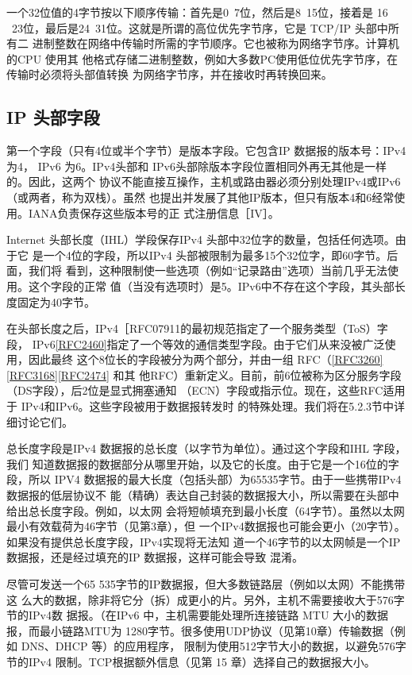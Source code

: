 一个32位值的4字节按以下顺序传输：首先是0~7位，然后是8~15位，接着是
16 ~23位，最后是24~31位。这就是所谓的高位优先字节序，它是 TCP/IP 头部中所有二
进制整数在网络中传输时所需的字节顺序。它也被称为网络字节序。计算机的CPU 使用其
他格式存储二进制整数，例如大多数PC使用低位优先字节序，在传输时必须将头部值转换
为网络字节序，并在接收时再转换回来。

\subsection{IP 头部字段}
第一个字段（只有4位或半个字节）是版本字段。它包含IP 数据报的版本号：IPv4 为4，
IPv6 为6。IPv4头部和 IPv6头部除版本字段位置相同外再无其他是一样的。因此，这两个
协议不能直接互操作，主机或路由器必须分别处理IPv4或IPv6（或两者，称为双栈）。虽然
也提出并发展了其他IP版本，但只有版本4和6经常使用。IANA负责保存这些版本号的正
式注册信息［IV］。

Internet 头部长度（IHL）学段保存IPv4 头部中32位字的数量，包括任何选项。由于它
是一个4位的字段，所以IPv4 头部被限制为最多15个32位字，即60字节。后面，我们将
看到，这种限制使一些选项（例如“记录路由”选项）当前几乎无法使用。这个字段的正常
值（当没有选项时）是5。IPv6中不存在这个字段，其头部长度固定为40字节。

在头部长度之后，IPv4［RFC07911的最初规范指定了一个服务类型（ToS）字段，
IPv6\href{https://www.rfc-editor.org/rfc/rfc2460}{[RFC2460]}指定了一个等效的通信类型字段。由于它们从来没被广泛使用，因此最终
这个8位长的字段被分为两个部分，并由一组 RFC（\href{https://www.rfc-editor.org/rfc/rfc3260}{[RFC3260]}\href{https://www.rfc-editor.org/rfc/rfc3168}{[RFC3168]}\href{https://www.rfc-editor.org/rfc/rfc2474}{[RFC2474]} 和其
他RFC）重新定义。目前，前6位被称为区分服务字段（DS字段），后2位是显式拥塞通知
（ECN）字段或指示位。现在，这些RFC适用于 IPv4和IPv6。这些字段被用于数据报转发时
的特殊处理。我们将在5.2.3节中详细讨论它们。

总长度字段是IPv4 数据报的总长度（以字节为单位）。通过这个字段和IHL 字段，我们
知道数据报的数据部分从哪里开始，以及它的长度。由于它是一个16位的字段，所以 IPV4
数据报的最大长度（包括头部）为65535字节。由于一些携带IPv4 数据报的低层协议不
能（精确）表达自己封装的数据报大小，所以需要在头部中给出总长度字段。例如，以太网
会将短帧填充到最小长度（64字节）。虽然以太网最小有效载荷为46字节（见第3章），但
一个IPv4数据报也可能会更小（20字节）。如果没有提供总长度字段，IPv4实现将无法知
道一个46字节的以太网帧是一个IP数据报，还是经过填充的IP 数据报，这样可能会导致
混淆。

尽管可发送一个65 535字节的IP数据报，但大多数链路层（例如以太网）不能携带这
么大的数据，除非将它分（拆）成更小的片。另外，主机不需要接收大于576字节的IPv4数
据报。（在IPv6 中，主机需要能处理所连接链路 MTU 大小的数据报，而最小链路MTU为
1280字节。很多使用UDP协议（见第10章）传输数据（例如 DNS、DHCP 等）的应用程序，
限制为使用512字节大小的数据，以避免576字节的IPv4 限制。TCP根据额外信息（见第
15 章）选择自己的数据报大小。

